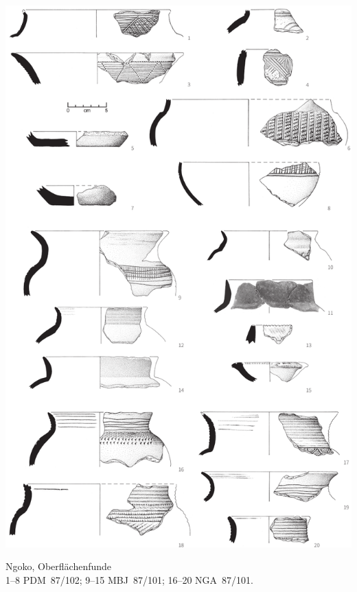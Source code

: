 \begin{pl}[H]
	\includegraphics{plt/Taf66.pdf}
	\vspace{.75em}\caption{\mbox{Ngoko}, Oberflächenfunde \\ 1--8 PDM~87/102; 9--15 MBJ~87/101; 16--20 NGA~87/101.}
	\label{pl:66}
\end{pl}

